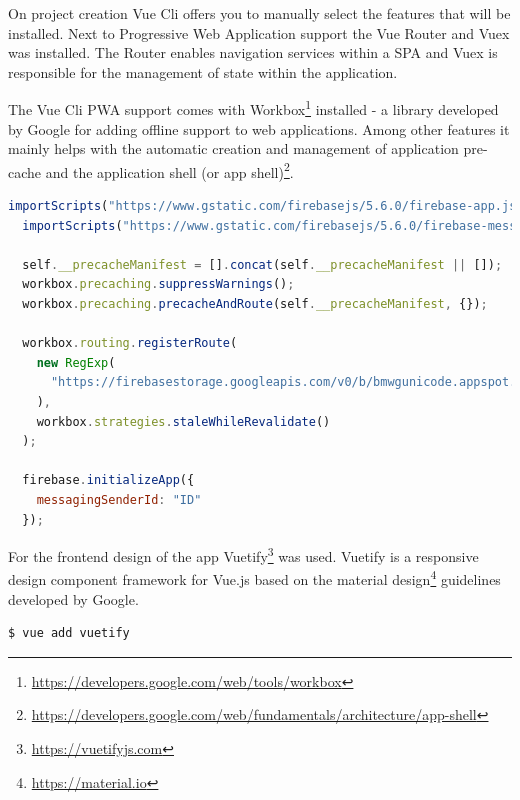 On project creation Vue Cli offers you to manually select the features that will be installed. Next to Progressive Web Application support the Vue Router and Vuex was installed. The Router enables navigation services within a SPA and Vuex is responsible for the management of state within the application.


The Vue Cli PWA support comes with Workbox\footnote{\url{https://developers.google.com/web/tools/workbox}} installed - a library developed by Google for adding offline support to web applications. Among other features it mainly helps with the automatic creation and management of application pre-cache and the application shell (or app shell)\footnote{\url{https://developers.google.com/web/fundamentals/architecture/app-shell}}.

\pagebreak

\begin{lstlisting}[language=JavaScript, caption=Service Worker with Workbox and Firebase specific initiation (firebase-messaging-sw.js), label=lst:serviceworker]
  importScripts("https://www.gstatic.com/firebasejs/5.6.0/firebase-app.js");
  importScripts("https://www.gstatic.com/firebasejs/5.6.0/firebase-messaging.js");

  self.__precacheManifest = [].concat(self.__precacheManifest || []);
  workbox.precaching.suppressWarnings();
  workbox.precaching.precacheAndRoute(self.__precacheManifest, {});

  workbox.routing.registerRoute(
    new RegExp(
      "https://firebasestorage.googleapis.com/v0/b/bmwgunicode.appspot.com/.*"
    ),
    workbox.strategies.staleWhileRevalidate()
  );

  firebase.initializeApp({
    messagingSenderId: "ID"
  });

\end{lstlisting}

For the frontend design of the app Vuetify\footnote{\url{https://vuetifyjs.com}} was used. Vuetify is a responsive design component framework for Vue.js based on the material design\footnote{\url{https://material.io}} guidelines developed by Google.

\begin{lstlisting}[language=bash, caption=Command to add Vuetify to a Vue.js project, label=lst:vuetify]
  $ vue add vuetify
\end{lstlisting}

